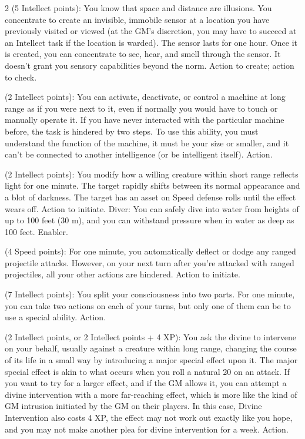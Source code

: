 \begin{multicols}{2}
 (5 Intellect points): You know that space and distance are illusions. You concentrate to create an invisible, immobile sensor at a location you have previously visited or viewed (at the GM’s discretion, you may have to succeed at an Intellect task if the location is warded). The sensor lasts for one hour. Once it is created, you can concentrate to see, hear, and smell through the sensor. It doesn’t grant you sensory capabilities beyond the norm. Action to create; action to check. 

 (2 Intellect points): You can activate, deactivate, or control a machine at long range as if you were next to it, even if normally you would have to touch or manually operate it. If you have never interacted with the particular machine before, the task is hindered by two steps. To use this ability, you must understand the function of the machine, it must be your size or smaller, and it can’t be connected to another intelligence (or be intelligent itself). Action. 

 (2 Intellect points): You modify how a willing creature within short range reflects light for one minute. The target rapidly shifts between its normal appearance and a blot of darkness. The target has an asset on Speed defense rolls until the effect wears off. Action to initiate. 
Diver: You can safely dive into water from heights of up to 100 feet (30 m), and you can withstand pressure when in water as deep as
100 feet. Enabler. 

 (4 Speed points): For one minute, you automatically deflect or dodge any ranged projectile attacks. However, on your next turn after you’re attacked with ranged projectiles, all your other actions are hindered. Action to initiate.

 (7 Intellect points): You split your consciousness into two parts. For one minute, you can take two actions on each of your turns, but only one of them can be to use a special ability. Action. 

 (2 Intellect points, or 2 Intellect points + 4 XP): You ask the divine to intervene on your behalf, usually against a creature within long range, changing the course of its life in a small way by introducing a major special effect upon it. The major special effect is akin to what occurs when you roll a natural 20 on an attack. If you want to try for a larger effect, and if the GM allows it, you can attempt a divine intervention with a more far-reaching effect, which is more like the kind of GM intrusion initiated by the GM on their players. In this case, Divine Intervention also costs 4 XP, the effect may not work out exactly like you hope, and you may not make another plea for divine intervention for a week. Action. 


\end{multicols}
